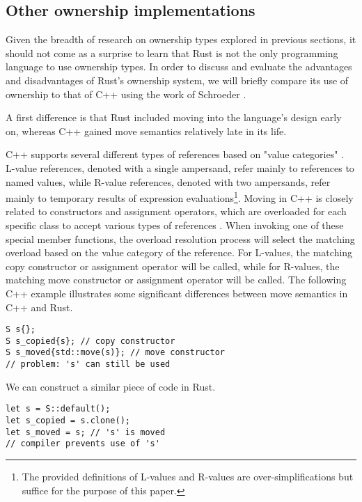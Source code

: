 \documentclass[sigplan,11pt,nonacm]{acmart}
\begin{document}
\subsection{Other ownership implementations}

Given the breadth of research on ownership types explored in previous sections, it should not come as a surprise to learn that Rust is not the only programming language to use ownership types.
In order to discuss and evaluate the advantages and disadvantages of Rust's ownership system, we will briefly compare its use of ownership to that of C++ using the work of Schroeder \cite{cpp-rust-ownership}.

A first difference is that Rust included moving into the language's design early on, whereas C++ gained move semantics relatively late in its life.

C++ supports several different types of references based on "value categories" \cite{cpp-value-categories}.
L-value references, denoted with a single ampersand, refer mainly to references to named values, while R-value references, denoted with two ampersands, refer mainly to temporary results of expression evaluations\footnote{The provided definitions of L-values and R-values are over-simplifications but suffice for the purpose of this paper.}.
Moving in C++ is closely related to constructors and assignment operators, which are overloaded for each specific class to accept various types of references \cite{cpp-rust-ownership}.
When invoking one of these special member functions, the overload resolution process will select the matching overload based on the value category of the reference.
For L-values, the matching copy constructor or assignment operator will be called, while for R-values, the matching move constructor or assignment operator will be called.
The following C++ example illustrates some significant differences between move semantics in C++ and Rust.

\begin{lstlisting}
S s{};
S s_copied{s}; // copy constructor
S s_moved{std::move(s)}; // move constructor
// problem: 's' can still be used
\end{lstlisting}

We can construct a similar piece of code in Rust.

\begin{lstlisting}
let s = S::default();
let s_copied = s.clone();
let s_moved = s; // 's' is moved
// compiler prevents use of 's'
\end{lstlisting}
\end{document}
